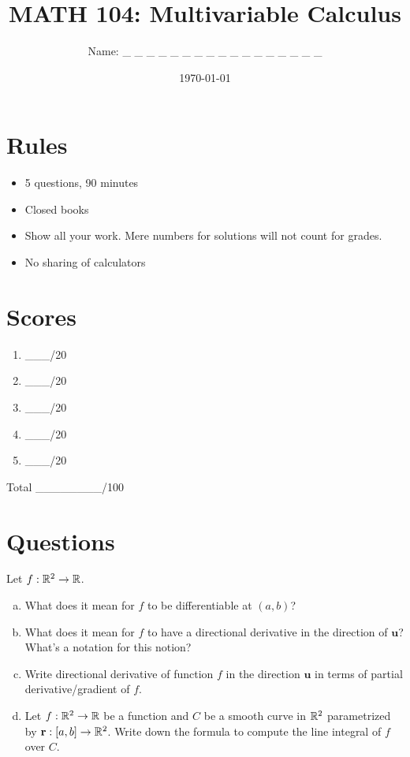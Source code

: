 \documentclass[12pt]{article}
\title{ MATH 104: Multivariable Calculus}
\author{Name: \_ \_ \_ \_ \_ \_ \_ \_ \_ \_ \_ \_ \_ \_ \_ \_ \_}
\date{\today}
\newcommand{\vect}{\mathbf}
\begin{document}
\maketitle

\section*{Rules}

\begin{itemize}
    \item 5 questions, 90 minutes
    \item Closed books
    \item Show all your work. Mere numbers for solutions will not count for grades.
    \item No sharing of calculators
\end{itemize}

\section*{Scores}

\begin{enumerate}[Problem 1.]
    \item  \_\_\_/20
    \item  \_\_\_/20
    \item \_\_\_/20
    \item  \_\_\_/20
    \item  \_\_\_/20
\end{enumerate}
Total \_\_\_\_\_\_\_\_/100


\newpage
\section*{Questions}

\begin{problem}Let $f:\mathbb{R}^2 \to \mathbb{R}$.
    \begin{enumerate}[a.]
        \item  What does it mean for $f$ to be 
            differentiable at $(a,b)$?
        \item What does it mean for $f$ to have a directional derivative
            in the direction of $\textbf{u}$? What's a notation for this notion?
        \item Write directional derivative of function $f$ in the direction $\textbf{u}$ in terms of partial derivative/gradient of $f$.
        \item Let $f:\mathbb{R}^2 \to \mathbb{R}$ be a function and $C$ be a smooth curve in $\mathbb{R}^2$ parametrized by $\vect{r}:[a,b]\to \R^2$. Write down the formula to compute the line integral of $f$ over $C$.
    \end{enumerate}
\end{problem}
\end{document}
